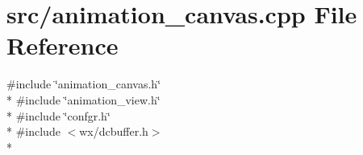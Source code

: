 \hypertarget{a00168}{\section{src/animation\-\_\-canvas.cpp File Reference}
\label{a00168}
}
{\ttfamily \#include \char`\"{}animation\-\_\-canvas.\-h\char`\"{}}\\*
{\ttfamily \#include \char`\"{}animation\-\_\-view.\-h\char`\"{}}\\*
{\ttfamily \#include \char`\"{}confgr.\-h\char`\"{}}\\*
{\ttfamily \#include $<$wx/dcbuffer.\-h$>$}\\*

